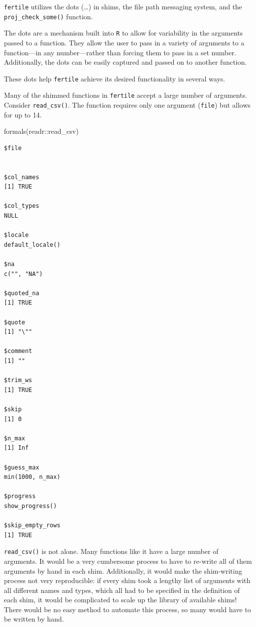 \documentclass[12pt,twoside]{reedthesis}
\newenvironment{Shaded}{\begin{snugshade}}{\end{snugshade}}
\newcommand{\FunctionTok}[1]{\textcolor[rgb]{0.00,0.00,0.00}{#1}}
\newcommand{\NormalTok}[1]{#1}
\newcommand{\SpecialCharTok}[1]{\textcolor[rgb]{0.00,0.00,0.00}{#1}}
\begin{document}
\texttt{fertile} utilizes the dots (\ldots) in shims, the file path messaging system, and the \texttt{proj\_check\_some()} function.

The dots are a mechanism built into \texttt{R} to allow for variability in the arguments passed to a function. They allow the user to pass in a variety of arguments to a function---in any number---rather than forcing them to pass in a set number. Additionally, the dots can be easily captured and passed on to another function.

These dots help \texttt{fertile} achieve its desired functionality in several ways.

Many of the shimmed functions in \texttt{fertile} accept a large number of arguments. Consider \texttt{read\_csv()}. The function requires only one argument (\texttt{file}) but allows for up to 14.
\begin{Shaded}
\begin{Highlighting}[]
\FunctionTok{formals}\NormalTok{(readr}\SpecialCharTok{::}\NormalTok{read\_csv)}
\end{Highlighting}
\end{Shaded}
\small
\begin{verbatim}
$file


$col_names
[1] TRUE

$col_types
NULL

$locale
default_locale()

$na
c("", "NA")

$quoted_na
[1] TRUE

$quote
[1] "\""

$comment
[1] ""

$trim_ws
[1] TRUE

$skip
[1] 0

$n_max
[1] Inf

$guess_max
min(1000, n_max)

$progress
show_progress()

$skip_empty_rows
[1] TRUE
\end{verbatim}
\normalsize

\texttt{read\_csv()} is not alone. Many functions like it have a large number of arguments. It would be a very cumbersome process to have to re-write all of them arguments by hand in each shim. Additionally, it would make the shim-writing process not very reproducible: if every shim took a lengthy list of arguments with all different names and types, which all had to be specified in the definition of each shim, it would be complicated to scale up the library of available shims! There would be no easy method to automate this process, so many would have to be written by hand.
\end{document}
